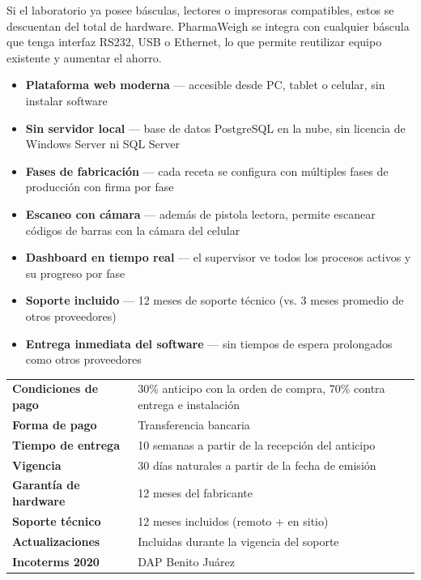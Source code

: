\documentclass[11pt]{article}
\begin{document}
\begin{cajaInfo}
Si el laboratorio ya posee básculas, lectores o impresoras compatibles, estos se descuentan del total de hardware. PharmaWeigh se integra con cualquier báscula que tenga interfaz RS232, USB o Ethernet, lo que permite reutilizar equipo existente y aumentar el ahorro.
\end{cajaInfo}


\begin{itemize}
    \item \textbf{Plataforma web moderna} --- accesible desde PC, tablet o celular, sin instalar software
    \item \textbf{Sin servidor local} --- base de datos PostgreSQL en la nube, sin licencia de Windows Server ni SQL Server
    \item \textbf{Fases de fabricación} --- cada receta se configura con múltiples fases de producción con firma por fase
    \item \textbf{Escaneo con cámara} --- además de pistola lectora, permite escanear códigos de barras con la cámara del celular
    \item \textbf{Dashboard en tiempo real} --- el supervisor ve todos los procesos activos y su progreso por fase
    \item \textbf{Soporte incluido} --- 12 meses de soporte técnico (vs. 3 meses promedio de otros proveedores)
    \item \textbf{Entrega inmediata del software} --- sin tiempos de espera prolongados como otros proveedores
\end{itemize}


\begin{tabularx}{\linewidth}{@{}>{\raggedright\arraybackslash}p{4cm} X@{}}
\toprule
\textbf{Condiciones de pago} & 30\% anticipo con la orden de compra, 70\% contra entrega e instalación \\
\textbf{Forma de pago} & Transferencia bancaria \\
\textbf{Tiempo de entrega} & 10 semanas a partir de la recepción del anticipo \\
\textbf{Vigencia} & 30 días naturales a partir de la fecha de emisión \\
\textbf{Garantía de hardware} & 12 meses del fabricante \\
\textbf{Soporte técnico} & 12 meses incluidos (remoto + en sitio) \\
\textbf{Actualizaciones} & Incluidas durante la vigencia del soporte \\
\textbf{Incoterms 2020} & DAP Benito Juárez \\
\bottomrule
\end{tabularx}
\end{document}
